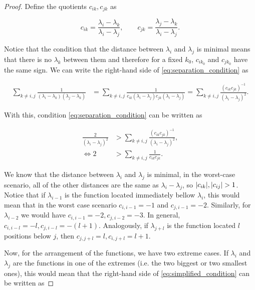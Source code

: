 \begin{proof}
    Define the quotients $c_{ik}, c_{jk}$ as 

    \begin{equation*}
        c_{ik} = \frac{\lambda_i - \lambda_k}{\lambda_i - \lambda_j}, \qquad c_{jk} = \frac{\lambda_j - \lambda_k}{\lambda_i - \lambda_j}.
    \end{equation*}

    Notice that the condition that the distance between $\lambda_i$ and $\lambda_j$ is minimal means that there is no $\lambda_k$ between them and therefore for a fixed $k_0$, $c_{ik_0}$ and $c_{jk_0}$ have the same sign. We can write the right-hand side of \eqref{eq:separation_condition} as

    \begin{align*}
        \sum_{k\neq i,j} \frac{1}{(\lambda_i - \lambda_k)(\lambda_j - \lambda_k)} &= \sum_{k\neq i,j} \frac{1}{ c_{ik}(\lambda_i - \lambda_j) c_{jk}(\lambda_i - \lambda_j)} = \sum_{k\neq i,j} \frac{ (c_{ik}c_{jk})^{-1} }{(\lambda_i-\lambda_j)^2}.
    \end{align*}

    With this, condition \eqref{eq:separation_condition} can be written as

    \begin{align}
        \frac{2}{(\lambda_i - \lambda_j)^2} &> \sum_{k\neq i,j} \frac{ (c_{ik}c_{jk})^{-1} }{(\lambda_i-\lambda_j)^2},\\
        \Leftrightarrow 2 &> \sum_{k\neq i,j} \frac{1}{c_{ik}c_{jk}}. \label{eq:simplified_condition}
    \end{align}

    We know that the distance between $\lambda_i$ and $\lambda_j$ is minimal, in the worst-case scenario, all of the other distances are the same as $\lambda_i - \lambda_j$, so $\lvert c_{ik} \rvert,\lvert c_{ij} \rvert>1$. Notice that if $\lambda_{i-1}$ is the function located immediately bellow $\lambda_i$, this would mean that in the worst case scenario $c_{i,i-1}=-1$ and $c_{j,i-1} = -2$. Similarly, for $\lambda_{i-2}$ we would have $c_{i,i-1} = -2, c_{j,i-2} =-3$. In general, $c_{i,i-l} = -l, c_{j,i-l} = -(l+1)$. Analogously, if $\lambda_{j+l}$ is the function located $l$ positions below $j$, then $c_{j,j+l} = l, c_{i,j+l} = l+1$.

    Now, for the arrangement of the functions, we have two extreme cases. If $\lambda_i$ and $\lambda_j$ are the functions in one of the extremes (i.e. the two biggest or two smallest ones), this would mean that the right-hand side of \eqref{eq:simplified_condition} can be written as


\end{proof}
